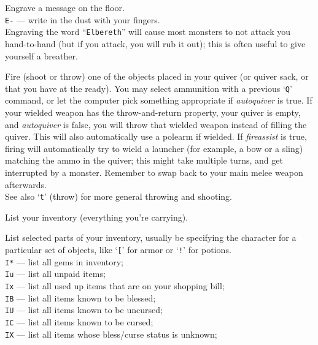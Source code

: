 \documentclass[titlepage]{article}
\begin{document}
\begin{description}[font=\mdseries\ttfamily]
\item[E]
Engrave a message on the floor.\\
\texttt{E-} --- write in the dust with your fingers.\\
Engraving the word ``\texttt{Elbereth}'' will cause most monsters to not attack
you hand-to-hand (but if you attack, you will rub it out); this is
often useful to give yourself a breather.
\item[f]
Fire (shoot or throw) one of the objects placed in your quiver (or
quiver sack, or that you have at the ready).
You may select ammunition with a previous `\texttt{Q}' command, or let the
computer pick something appropriate if \textit{autoquiver} is true.
If your wielded weapon has the throw-and-return property, your quiver
is empty, and \textit{autoquiver}
is false, you will throw that wielded weapon instead of filling the quiver.
This will also automatically use a polearm if wielded.
If \textit{fireassist} is true, firing will automatically try to wield a launcher
(for example, a bow or a sling) matching the ammo in the quiver; this might
take multiple turns, and get interrupted by a monster.
Remember to swap back to your main melee weapon afterwards.
\\
See also `\texttt{t}' (throw) for more general throwing and shooting.
\item[i]
List your inventory (everything you're carrying).
\item[I]
List selected parts of your inventory, usually be specifying the character
for a particular set of objects, like `\texttt{[}' for armor or `\texttt{!}'
for potions.\\
\texttt{I*} --- list all gems in inventory;\\
\texttt{Iu} --- list all unpaid items;\\
\texttt{Ix} --- list all used up items that are on your shopping bill;\\
\texttt{IB} --- list all items known to be blessed;\\
\texttt{IU} --- list all items known to be uncursed;\\
\texttt{IC} --- list all items known to be cursed;\\
\texttt{IX} --- list all items whose bless/curse status is unknown;\\

\end{description}
\end{document}
